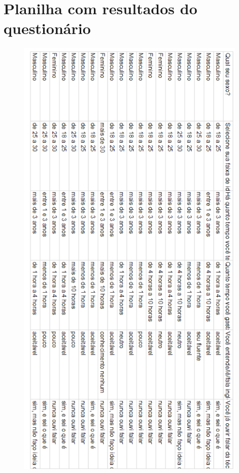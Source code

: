 \documentclass[
	12pt,				%
	openany,			%
	oneside,			%
	a4paper,			%
	english,			%
	french,				%
	spanish,			%
	brazil				%
	]{abntex2}
\begin{document}
\begin{apendicesenv}
\begin{figure}[H]
\end{figure}
\chapter{Planilha com resultados do questionário}

\begin{figure}[H]
    \centering

\includegraphics[width=11cm]{figuras/6.png}
\par

\end{figure}

\begin{figure}[H]
    \centering


\end{figure}
\end{apendicesenv}
\end{document}

